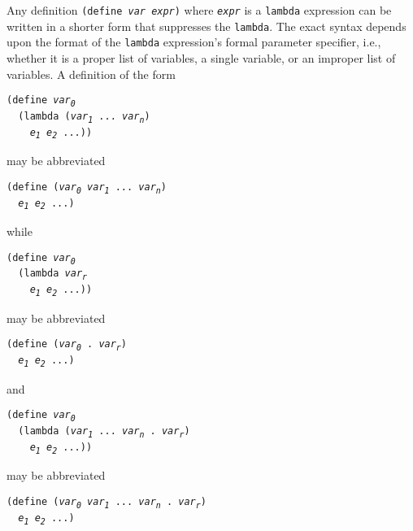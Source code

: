 Any definition \texttt{(define \textit{var} \textit{expr})} where \texttt{\textit{expr}} is a
\texttt{lambda} expression can be written in a shorter form that suppresses
the \texttt{lambda}.
The exact syntax depends upon the format of the \texttt{lambda} expression's
formal parameter specifier, i.e., whether it is a proper list of
variables, a single variable, or an improper list of variables.
A definition of the form


\begin{alltt}
(define \textit{var\textsubscript{0}}
  (lambda (\textit{var\textsubscript{1}} ... \textit{var\textsubscript{n}})
    \textit{e\textsubscript{1}} \textit{e\textsubscript{2}} ...))
\end{alltt}


may be abbreviated


\begin{alltt}
(define (\textit{var\textsubscript{0}} \textit{var\textsubscript{1}} ... \textit{var\textsubscript{n}})
  \textit{e\textsubscript{1}} \textit{e\textsubscript{2}} ...)
\end{alltt}


while


\begin{alltt}
(define \textit{var\textsubscript{0}}
  (lambda \textit{var\textsubscript{r}}
    \textit{e\textsubscript{1}} \textit{e\textsubscript{2}} ...))
\end{alltt}


may be abbreviated


\begin{alltt}
(define (\textit{var\textsubscript{0}} . \textit{var\textsubscript{r}})
  \textit{e\textsubscript{1}} \textit{e\textsubscript{2}} ...)
\end{alltt}


and


\begin{alltt}
(define \textit{var\textsubscript{0}}
  (lambda (\textit{var\textsubscript{1}} ... \textit{var\textsubscript{n}} . \textit{var\textsubscript{r}})
    \textit{e\textsubscript{1}} \textit{e\textsubscript{2}} ...))
\end{alltt}


may be abbreviated


\begin{alltt}
(define (\textit{var\textsubscript{0}} \textit{var\textsubscript{1}} ... \textit{var\textsubscript{n}} . \textit{var\textsubscript{r}})
  \textit{e\textsubscript{1}} \textit{e\textsubscript{2}} ...)
\end{alltt}


